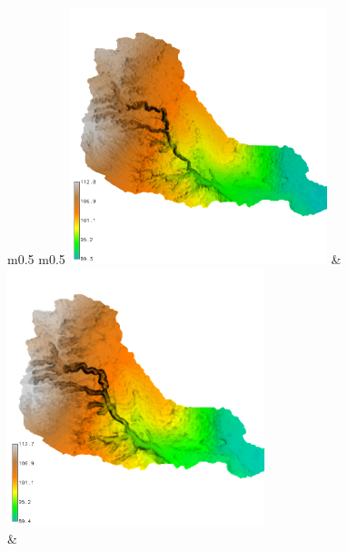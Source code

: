\documentclass{standalone}
\begin{document}
\scriptsize
\centering 

\begin{tabular}{m{} m{}}
%
{\includegraphics[height=75mm]{../../images/sample_data/elevation_2016.png}} & 
{\includegraphics[height=75mm]{../../images/ss_transport/shaded_relief.png}}\\
%
 & 
\\
%
\label{fig:evolution}
\end{tabular}
\end{document}
